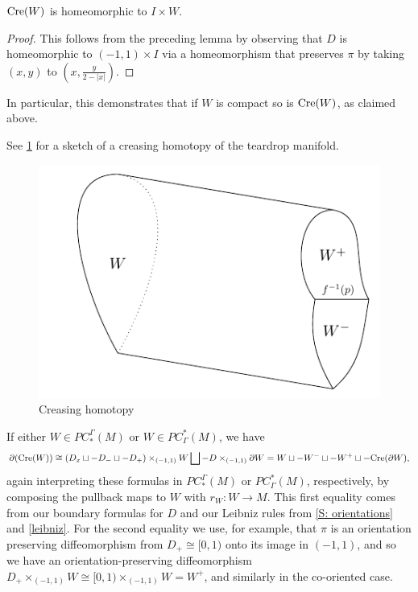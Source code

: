 \begin{corollary}
$\mathrm{Cre}(W)$ is homeomorphic to $I\times W$.
\end{corollary}
\begin{proof}
This follows from the preceding lemma by observing that $D$ is homeomorphic to $(-1,1)\times I$ via a homeomorphism that preserves $\pi$ by taking $(x,y)$ to $\left(x, \frac{y}{2-|x|}\right)$.
\end{proof}


In particular, this demonstrates that if $W$ is compact so is $\mathrm{Cre}(W)$, as claimed above.

See \cref{F: creasing} for a sketch of a creasing homotopy of the teardrop manifold.



\begin{figure}
	\includegraphics{figures/creasing2.pdf}
	\caption{Creasing homotopy}
	\label{F: creasing}
\end{figure}



If either $W\in PC^\Gamma_*(M)$ or  $W\in PC_\Gamma^*(M)$, we have
\begin{equation}\label{E: bd crease}
\partial(\mathrm{Cre}(W))\cong(D_x\sqcup -D_-\sqcup -D_+)\times_{(-1,1)} W \bigsqcup -D\times_{(-1,1)}\partial W=W\sqcup -W^-\sqcup -W^+\sqcup -\mathrm{Cre}(\partial W),
\end{equation}
again interpreting these formulas in $PC^\Gamma_*(M)$ or  $PC_\Gamma^*(M)$, respectively, by composing the pullback maps to $W$ with $r_W:W\to M$. This first equality comes from our boundary formulas for $D$ and our  Leibniz rules from \cref{S: orientations} and \cref{leibniz}. For the second equality we use, for example, that $\pi$ is an orientation preserving diffeomorphism from $D_+\cong [0,1)$ onto its image in $(-1,1)$, and so we have an orientation-preserving diffeomorphism $D_+\times_{(-1,1)} W\cong [0,1)\times_{(-1,1)} W=W^+$, and similarly in the co-oriented case.

